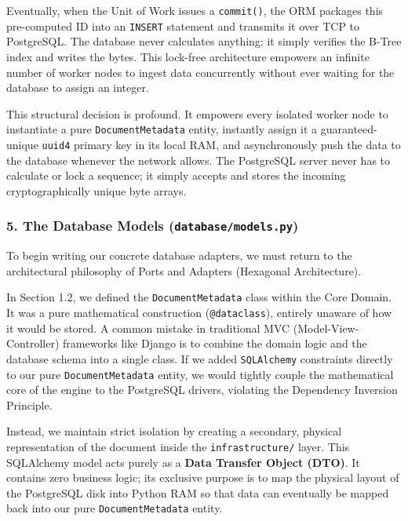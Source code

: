 Eventually, when the Unit of Work issues a \texttt{commit()}, the ORM packages this pre-computed ID into an \texttt{INSERT} statement and transmits it over TCP to PostgreSQL. The database never calculates anything; it simply verifies the B-Tree index and writes the bytes. This lock-free architecture empowers an infinite number of worker nodes to ingest data concurrently without ever waiting for the database to assign an integer.

This structural decision is profound. It empowers every isolated worker node to instantiate a pure \texttt{DocumentMetadata} entity, instantly assign it a guaranteed-unique \texttt{uuid4} primary key in its local RAM, and asynchronously push the data to the database whenever the network allows. The PostgreSQL server never has to calculate or lock a sequence; it simply accepts and stores the incoming cryptographically unique byte arrays.








\subsubsection*{5. The Database Models (\texttt{database/models.py})}

To begin writing our concrete database adapters, we must return to the architectural philosophy of Ports and Adapters (Hexagonal Architecture).

In Section 1.2, we defined the \texttt{DocumentMetadata} class within the Core Domain. It was a pure mathematical construction (\texttt{@dataclass}), entirely unaware of how it would be stored. A common mistake in traditional MVC (Model-View-Controller) frameworks like Django is to combine the domain logic and the database schema into a single class. If we added \texttt{SQLAlchemy} constraints directly to our pure \texttt{DocumentMetadata} entity, we would tightly couple the mathematical core of the engine to the PostgreSQL drivers, violating the Dependency Inversion Principle.

Instead, we maintain strict isolation by creating a secondary, physical representation of the document inside the \texttt{infrastructure/} layer. This SQLAlchemy model acts purely as a \textbf{Data Transfer Object (DTO)}. It contains zero business logic; its exclusive purpose is to map the physical layout of the PostgreSQL disk into Python RAM so that data can eventually be mapped back into our pure \texttt{DocumentMetadata} entity.

